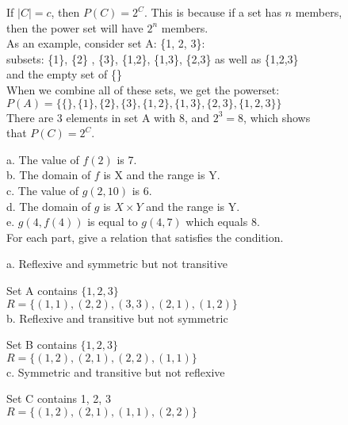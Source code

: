 \documentclass[12pt]{article}
\begin{document}
\indent
If $|C| = c$, then $P(C) = 2^{C}$. This is because if a set has $n$ members, \\
\indent then the power set will have $2^{n}$ members. \\

As an example, consider set A: \{1, 2, 3\}: \\

subsets: \{1\}, \{2\} , \{3\}, \{1,2\}, \{1,3\}, \{2,3\} as well as \{1,2,3\} \\
\indent and the empty set of \{\} \\

When we combine all of these sets, we get the powerset: \\
\indent $P(A) = \{\{\},  \{1\}, \{2\}, \{3\}, \{1,2\}, \{1,3\}, \{2,3\}, \{1,2,3\}  \}$ \\

There are 3 elements in set A with 8, and $2^{3} = 8$, which shows \\
\indent that $P(C) = 2^{C}$. \\


a. The value of $f(2)$ is 7. \\
\indent b. The domain of $f$ is X and the range is Y. \\
\indent c. The value of $g(2,10)$ is 6. \\
\indent d. The domain of $g$ is $X \times Y$ and the range is Y. \\
\indent e. $g(4, f(4))$ is equal to $g(4, 7)$ which equals 8. \\

 \quad For each part, give a relation that satisfies the condition.

a. Reflexive and symmetric but not transitive

\quad Set A contains $\{1, 2, 3\}$ \\
\indent \quad $R = \{(1,1), (2,2), (3,3), (2,1), (1, 2) \}$ \\

b. Reflexive and transitive but not symmetric

\quad Set B contains $\{1, 2, 3\}$ \\
\indent \quad $R = \{(1,2), (2,1), (2,2), (1,1)\} $ \\

c. Symmetric and transitive but not reflexive

\quad Set C contains {1, 2, 3} \\
\indent \quad $R = \{(1,2), (2,1), (1,1), (2,2)\}$ \\ \\
\end{document}
